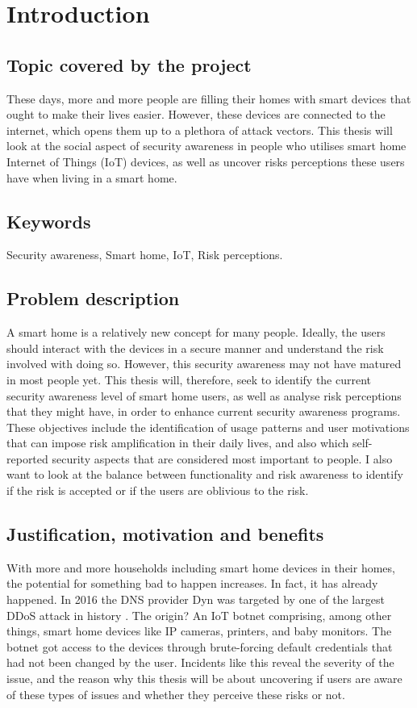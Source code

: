 \chapter{Introduction}
\label{chap:intro}

\section{Topic covered by the project}
These days, more and more people are filling their homes with smart devices that ought to make their lives easier. However, these devices are connected to the internet, which opens them up to a plethora of attack vectors. This thesis will look at the social aspect of security awareness in people who utilises smart home Internet of Things (IoT) devices, as well as uncover risks perceptions these users have when living in a smart home. 

\section{Keywords}
Security awareness, Smart home, IoT, Risk perceptions. 

\section{Problem description}
A smart home is a relatively new concept for many people. Ideally, the users should interact with the devices in a secure manner and understand the risk involved with doing so. However, this security awareness may not have matured in most people yet. This thesis will, therefore, seek to identify the current security awareness level of smart home users, as well as analyse risk perceptions that they might have, in order to enhance current security awareness programs. These objectives include the identification of usage patterns and user motivations that can impose risk amplification in their daily lives, and also which self-reported security aspects that are considered most important to people. I also want to look at the balance between functionality and risk awareness to identify if the risk is accepted or if the users are oblivious to the risk. 

\section{Justification, motivation and benefits}
With more and more households including smart home devices in their homes, the potential for something bad to happen increases. In fact, it has already happened. In 2016 the DNS provider Dyn was targeted by one of the largest DDoS attack in history \cite{wiki:Dyn}. The origin? An IoT botnet comprising, among other things, smart home devices like IP cameras, printers, and baby monitors. The botnet got access to the devices through brute-forcing default credentials that had not been changed by the user. Incidents like this reveal the severity of the issue, and the reason why this thesis will be about uncovering if users are aware of these types of issues and whether they perceive these risks or not. 

